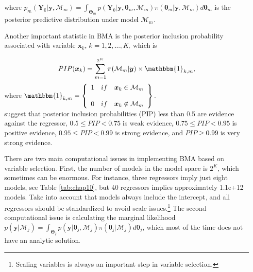 where $p_m(\bm{Y}_0|\bm{y},\mathcal{M}_m)=\int_{\bm{\Theta}_m} p(\bm{Y}_0|\bm{y},\bm{\theta}_m,\mathcal{M}_m)\pi(\bm{\theta}_m |\bm{y}, \mathcal{M}_m) d\bm{\theta}_{m}$ is the posterior predictive distribution under model $\mathcal{M}_m$. 

Another important statistic in BMA is the posterior inclusion probability associated with variable $\bm{x}_k$, $k=1,2,\dots,K$, which is

\begin{equation*}
	PIP(\bm{x}_k)=\sum_{m=1}^{2^K}\pi(\mathcal{M}_m|\bm{y})\times \mathbbm{1}_{k,m},
\end{equation*}
where
$\mathbbm{1}_{k,m}= \left\{ \begin{array}{lcc}
	1&   if  & \bm{x}_{k}\in \mathcal{M}_m \\
	\\ 0 &  if & \bm{x}_{k}\not \in \mathcal{M}_m
\end{array}
\right\}.$\\

\cite{Kass1995} suggest that posterior inclusion probabilities (PIP) less than 0.5 are evidence against the regressor, $0.5\leq PIP<0.75$ is weak evidence, $0.75\leq PIP<0.95$ is positive evidence, $0.95\leq PIP<0.99$ is strong evidence, and $PIP\geq 0.99$ is very strong evidence.

There are two main computational issues in implementing BMA based on variable selection. First, the number of models in the model space is $2^K$, which sometimes can be enormous. For instance, three regressors imply just eight models, see Table \ref{tab:chap10}, but 40 regressors implies approximately  1.1e+12 models. Take into account that models always include the intercept, and all regressors should be standardized to avoid scale issues.\footnote{Scaling variables is always an important step in variable selection.} The second computational issue is calculating the marginal likelihood $p(\bm{y} | \mathcal{M}_j)=\int_{\bm{\Theta}_j} p(\bm{y}| \bm{\theta}_j,\mathcal{M}_j)\pi(\bm{\theta}_j | \mathcal{M}_j) d\bm{\theta}_{j}$, which most of the time does not have an analytic solution. 

